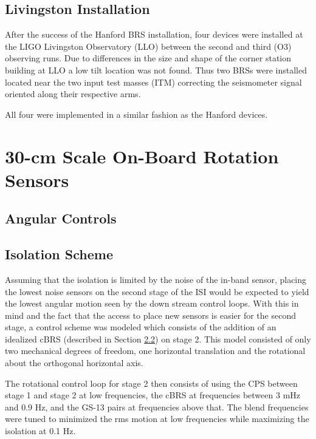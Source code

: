 \documentclass [12pt, proquest]{uwthesis}[2019]
\begin{document}
\section{Livingston Installation}

\quad After the success of the Hanford BRS installation, four devices were installed at the LIGO Livingston Observatory (LLO) between the second and third (O3) observing runs. Due to differences in the size and shape of the corner station building at LLO a low tilt location was not found. Thus two BRSs were installed located near the two input test masses (ITM) correcting the seismometer signal oriented along their respective arms. 

All four were implemented in a similar fashion as the Hanford devices.

\chapter{30-cm Scale On-Board Rotation Sensors}
\section{Angular Controls}
\section{Isolation Scheme}

Assuming that the isolation is limited by the noise of the in-band sensor, placing the lowest noise sensors on the second stage of the ISI would be expected to yield the lowest angular motion seen by the down stream control loops. With this in mind and the fact that the access to place new sensors is easier for the second stage, a control scheme was modeled which consists of the addition of an idealized cBRS (described in Section \ref{}) on stage 2. This model consisted of only two mechanical degrees of freedom, one horizontal translation and the rotational about the orthogonal horizontal axis.

The rotational control loop for stage 2 then consists of using the CPS between stage 1 and stage 2 at low frequencies, the cBRS at frequencies between 3 mHz and 0.9 Hz, and the GS-13 pairs at frequencies above that. The blend frequencies were tuned to minimized the rms motion at low frequencies while maximizing the isolation at 0.1 Hz. 
\end{document}
